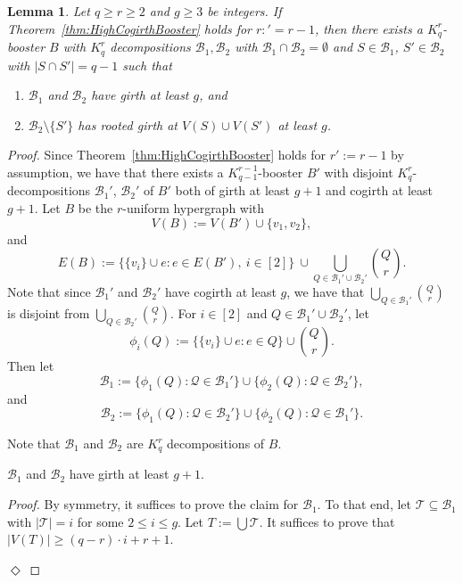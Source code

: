 \documentclass[11pt]{article}
\newcounter{i}
\theoremstyle{plain}
\newtheorem{lem}[thm]{Lemma}
\newenvironment{proofclaim}[1][]%
{\noindent \emph{Proof.} {}{#1}{}}{\hfill
	$\Diamond$\vspace{1em}}
\renewcommand{\theclaim}{\thetheorem.\arabic{claim}}
\newenvironment{nonlateproof}[1]
 {%
  \renewcommand{\theclaim}{\ref{#1}.\arabic{claim}}%
  \begin{proof}%
 }
 {\end{proof}}
\theoremstyle{plain} %
\theoremstyle{definition}
\begin{document}
\begin{lem}\label{lem:HighGirthBoost}
Let $q\ge r\ge 2$ and $g\ge 3$ be integers. If Theorem~\ref{thm:HighCogirthBooster} holds for $r:'=r-1$, then there exists a $K_q^r$-booster $B$ with $K_q^r$ decompositions $\mathcal{B}_1,\mathcal{B}_2$ with $\mathcal{B}_1\cap \mathcal{B}_2 = \emptyset$ and $S\in \mathcal{B}_1$, $S'\in \mathcal{B}_2$ with $|S\cap S'|=q-1$ such that 
\begin{enumerate}
    \item[(1)] $\mathcal{B}_1$ and $\mathcal{B}_2$ have girth at least $g$, and
    \item[(2)] $\mathcal{B}_2\setminus \{S'\}$ has rooted girth at $V(S)\cup V(S')$ at least $g$.
\end{enumerate}
\end{lem}
\begin{nonlateproof}{lem:HighGirthBoost}
Since Theorem~\ref{thm:HighCogirthBooster} holds for $r':=r-1$ by assumption, we have that there exists a $K_{q-1}^{r-1}$-booster $B'$ with disjoint $K_q^r$-decompositions $\mathcal{B}_1'$, $\mathcal{B}_2'$ of $B'$ both of girth at least $g+1$ and cogirth at least $g+1$. Let $B$ be the $r$-uniform hypergraph with
$$V(B):= V(B')\cup \{v_1,v_2\},$$
and
$$E(B):= \bigg\{ \{v_i\}\cup e: e\in E(B'),~i\in [2]\bigg\}~\cup \bigcup_{Q\in \mathcal{B}_1'\cup\mathcal{B}_2'} \binom{Q}{r}.$$
Note that since $\mathcal{B}_1'$ and $\mathcal{B}_2'$ have cogirth at least $g$, we have that $\bigcup_{Q\in\mathcal{B}_1'} \binom{Q}{r}$ is disjoint from $\bigcup_{Q\in \mathcal{B}_2'} \binom{Q}{r}$.
For $i\in [2]$ and $Q\in \mathcal{B}_1'\cup \mathcal{B}_2'$, let
$$\phi_i(Q):= \bigg\{ \{v_i\}\cup e: e\in Q\bigg\} \cup \binom {Q}{r}.$$
Then let
$$\mathcal{B}_1:= \{ \phi_1(Q): \mathcal{Q}\in \mathcal{B}_1'\} \cup \{ \phi_2(Q): \mathcal{Q}\in \mathcal{B}_2'\},$$
and
$$\mathcal{B}_2:= \{ \phi_1(Q): \mathcal{Q}\in \mathcal{B}_2'\} \cup \{ \phi_2(Q): \mathcal{Q}\in \mathcal{B}_1'\}.$$

Note that $\mathcal{B}_1$ and $\mathcal{B}_2$ are $K_q^r$ decompositions of $B$.

\begin{claim}\label{claim:girthg}
$\mathcal{B}_1$ and $\mathcal{B}_2$ have girth at least $g+1$. 
\end{claim}
\begin{proofclaim}
By symmetry, it suffices to prove the claim for $\mathcal{B}_1$. To that end, let $\mathcal{T} \subseteq \mathcal{B}_1$ with $|\mathcal{T}|=i$ for some $2\le i \le g$. Let $T:= \bigcup \mathcal{T}$. It suffices to prove that $|V(T)|\ge (q-r)\cdot i + r + 1$.


\end{proofclaim}
\end{nonlateproof}
\end{document}
